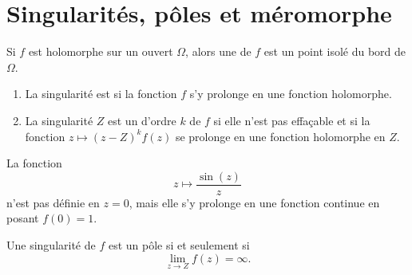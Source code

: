 
\section{Singularités, pôles et méromorphe}

\begin{definition}
    Si \( f\) est holomorphe sur un ouvert \( \Omega\), alors une  de \( f\) est un point isolé du bord de \( \Omega\).
    \begin{enumerate}
        \item
            La singularité est  si la fonction \( f\) s'y prolonge en une fonction holomorphe.
        \item
            La singularité \( Z\) est un  d'ordre \( k\) de \( f\) si elle n'est pas effaçable et si la fonction \( z\mapsto (z-Z)^kf(z)\) se prolonge en une fonction holomorphe en \( Z\).
    \end{enumerate}
\end{definition}

\begin{example}
    La fonction 
    \begin{equation}
        z\mapsto \frac{ \sin(z) }{ z }
    \end{equation}
    n'est pas définie en \( z=0\), mais elle s'y prolonge en une fonction continue en posant \( f(0)=1\).
\end{example}

\begin{proposition}
    Une singularité de \( f\) est un pôle si et seulement si
    \begin{equation}
        \lim_{z\to Z}f(z)=\infty.
    \end{equation}
\end{proposition}


